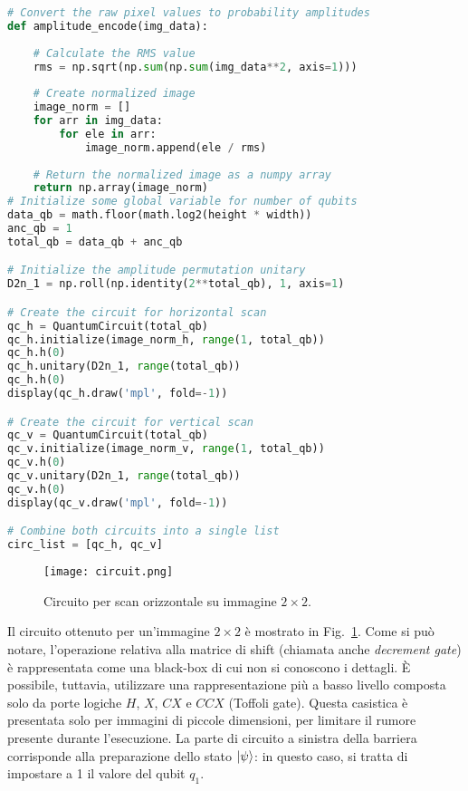 \begin{lstlisting}[language=Python, 
    caption={Creazione dei circuiti per lo scan orizzontale e verticale.}, label=cod:circuit]
# Convert the raw pixel values to probability amplitudes
def amplitude_encode(img_data):
    
    # Calculate the RMS value
    rms = np.sqrt(np.sum(np.sum(img_data**2, axis=1)))
    
    # Create normalized image
    image_norm = []
    for arr in img_data:
        for ele in arr:
            image_norm.append(ele / rms)
        
    # Return the normalized image as a numpy array
    return np.array(image_norm)
# Initialize some global variable for number of qubits
data_qb = math.floor(math.log2(height * width))
anc_qb = 1
total_qb = data_qb + anc_qb

# Initialize the amplitude permutation unitary
D2n_1 = np.roll(np.identity(2**total_qb), 1, axis=1)

# Create the circuit for horizontal scan
qc_h = QuantumCircuit(total_qb)
qc_h.initialize(image_norm_h, range(1, total_qb))
qc_h.h(0)
qc_h.unitary(D2n_1, range(total_qb))
qc_h.h(0)
display(qc_h.draw('mpl', fold=-1))

# Create the circuit for vertical scan
qc_v = QuantumCircuit(total_qb)
qc_v.initialize(image_norm_v, range(1, total_qb))
qc_v.h(0)
qc_v.unitary(D2n_1, range(total_qb))
qc_v.h(0)
display(qc_v.draw('mpl', fold=-1))

# Combine both circuits into a single list
circ_list = [qc_h, qc_v]
\end{lstlisting} 

\begin{figure}[ht]
    \texttt{[image: circuit.png]}
    \caption{Circuito per scan orizzontale su immagine $2 \times 2$.}
    \label{fig:circuit}
\end{figure}

Il circuito ottenuto per un'immagine $2 \times 2$ è mostrato in Fig.~\ref{fig:circuit}.
Come si può notare, l'operazione relativa alla matrice di shift (chiamata anche
\emph{decrement gate}) è 
rappresentata come una black-box di cui non si conoscono i dettagli.
È possibile, tuttavia, utilizzare una rappresentazione più a basso livello 
composta solo da porte logiche $H$, $X$, $CX$ e $CCX$ (Toffoli gate).
Questa casistica è presentata solo per immagini di piccole dimensioni, per limitare il 
rumore presente durante l'esecuzione. La parte di circuito a sinistra della barriera
corrisponde alla preparazione dello stato $\lvert\psi\rangle$: in questo caso, si tratta 
di impostare a 1 il valore del qubit $q_1$.

